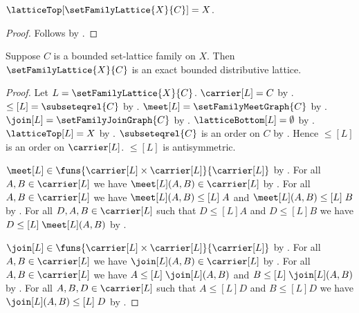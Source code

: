 \begin{proposition}\label{set_family_lattice_top}
    $\latticeTop[\setFamilyLattice{X}{C}]=X$.
\end{proposition}
\begin{proof}
    Follows by
        .
\end{proof}

\begin{theorem}\label{set_family_lattice_is_exact_bounded_distributive_lattice}
    Suppose $C$ is a bounded set-lattice family on $X$.
    Then $\setFamilyLattice{X}{C}$ is an exact bounded distributive lattice.
\end{theorem}
\begin{proof}
    Let $L=\setFamilyLattice{X}{C}$.
    $\carrier[L]=C$ by .
    $\leq[L]=\subseteqrel{C}$ by .
    $\meet[L]=\setFamilyMeetGraph{C}$ by
        .
    $\join[L]=\setFamilyJoinGraph{C}$ by
        .
    $\latticeBottom[L]=\emptyset$ by
        .
    $\latticeTop[L]=X$ by .
    $\subseteqrel{C}$ is an order on $C$ by
        .
    Hence $\leq[L]$ is an order on $\carrier[L]$.
    $\leq[L]$ is antisymmetric.

    $\meet[L]\in\funs{\carrier[L]\times\carrier[L]}{\carrier[L]}$ by
        .
    For all $A,B\in\carrier[L]$ we have
        $\meet[L](A,B)\in\carrier[L]$ by
        .
    For all $A,B\in\carrier[L]$ we have
        $\meet[L](A,B)\mathrel{\leq[L]}A$ and
        $\meet[L](A,B)\mathrel{\leq[L]}B$ by
        .
    For all $D,A,B\in\carrier[L]$ such that
        $D\mathrel{\leq[L]}A$ and $D\mathrel{\leq[L]}B$ we have
        $D\mathrel{\leq[L]}\meet[L](A,B)$ by
        .

    $\join[L]\in\funs{\carrier[L]\times\carrier[L]}{\carrier[L]}$ by
        .
    For all $A,B\in\carrier[L]$ we have
        $\join[L](A,B)\in\carrier[L]$ by
        .
    For all $A,B\in\carrier[L]$ we have
        $A\mathrel{\leq[L]}\join[L](A,B)$ and
        $B\mathrel{\leq[L]}\join[L](A,B)$ by
        .
    For all $A,B,D\in\carrier[L]$ such that
        $A\mathrel{\leq[L]}D$ and $B\mathrel{\leq[L]}D$ we have
        $\join[L](A,B)\mathrel{\leq[L]}D$ by
        .


\end{proof}
